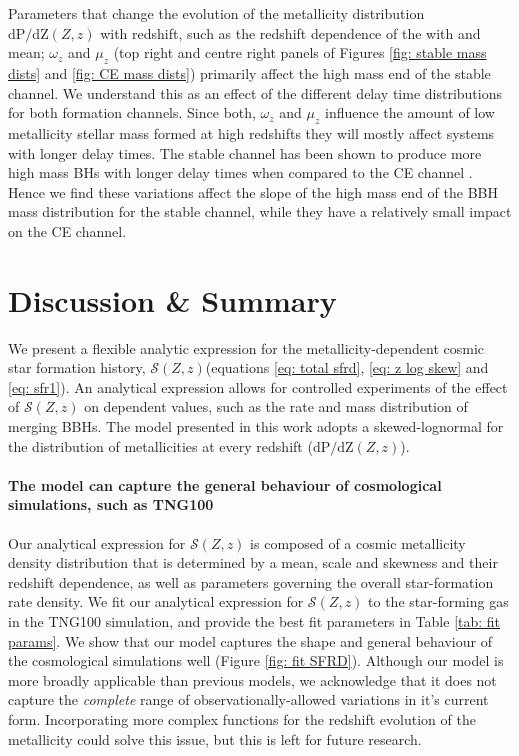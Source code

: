 \documentclass[linenumbers,twocolumn]{aastex631}
\newcommand{\SFRDzZ}{\ensuremath{\mathcal{S}(Z,z)}\xspace}
\newcommand{\dpdZ}{\ensuremath{\mathrm{dP/dZ}(Z,z)}\xspace}
\begin{document}
Parameters that change the evolution of the metallicity distribution \dpdZ with redshift, such as the redshift dependence of the with and mean; $\omega_z$ and $\mu_z$ (top right and centre right panels of Figures \ref{fig: stable mass dists} and \ref{fig: CE mass dists}) primarily affect the high mass end of the stable channel. 
We understand this as an effect of the different delay time distributions for both formation channels. Since both, $\omega_z$ and $\mu_z$ influence the amount of low metallicity stellar mass formed at high redshifts they will mostly affect systems with longer delay times. The stable channel has been shown to produce more high mass BHs with longer delay times when compared to the CE channel \citep{vanson+2022, Briel+2022}. 
Hence we find these variations affect the slope of the high mass end of the BBH mass distribution for the stable channel, while they have a relatively small impact on the CE channel.



\section{Discussion \& Summary \label{sec: summary}}
We present a flexible analytic expression for the metallicity-dependent cosmic star formation history, \SFRDzZ (equations \ref{eq: total sfrd}, \ref{eq: z log skew} and \ref{eq: sfr1}). An analytical expression allows for controlled experiments of the effect of \SFRDzZ on dependent values, such as the rate and mass distribution of merging BBHs. The model presented in this work adopts a skewed-lognormal for the distribution of metallicities at every redshift (\dpdZ). 

\paragraph{The model can capture the general behaviour of cosmological simulations, such as TNG100}
Our analytical expression for \SFRDzZ is composed of a cosmic metallicity density distribution that is determined by a mean, scale and skewness and their redshift dependence, as well as parameters governing the overall star-formation rate density. We fit our analytical expression for \SFRDzZ to the star-forming gas in the TNG100 simulation, and provide the best fit parameters in Table \ref{tab: fit params}. 
We show that our model captures the shape and general behaviour of the cosmological simulations well (Figure \ref{fig: fit SFRD}). 
Although our model is more broadly applicable than previous models, we acknowledge that it does not capture the \textit{complete} range of observationally-allowed variations in it's current form. Incorporating more complex functions for the redshift evolution of the metallicity could solve this issue, but this is left for future research.    
\end{document}
